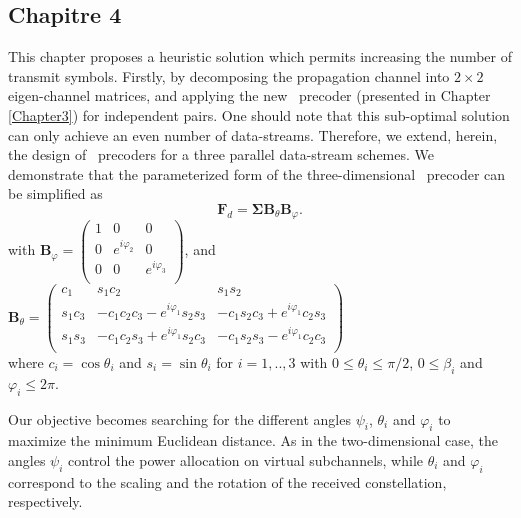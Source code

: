 \subsection*{Chapitre 4}
This chapter proposes a heuristic solution which permits increasing the number of transmit symbols. Firstly, by decomposing the propagation channel into $2 \times 2$ eigen-channel matrices, and applying the new \maxdmin\ precoder (presented in Chapter \ref{Chapter3}) for independent pairs. One should note that this sub-optimal solution can only achieve an even number of data-streams. Therefore, we extend, herein, the design of \maxdmin\ precoders for a three parallel data-stream schemes. We demonstrate that the parameterized form of the three-dimensional \maxdmin\ precoder can be  simplified as 
\begin{equation}
\label{eq_ab4_fdmin}
	\mathbf{F}_d= \mathbf{\Sigma} \mathbf{B}_\theta \mathbf{B}_\varphi .
\end{equation}
with $\mathbf{B}_\varphi = \begin{pmatrix}
				1 &  0 & 0 \\
				0 & e^{i \varphi_2} & 0 \\
				0 & 0 &  e^{i \varphi_3} \\
		 		\end{pmatrix}$,
and $\mathbf{B}_\theta = \begin{pmatrix}
				c_1 &  s_1 c_2 & s_1 s_2 \\
				s_1 c_3 & -c_1 c_2 c_3 - e^{i \varphi_1} s_2 s_3 & -c_1 s_2 c_3 + e^{i \varphi_1} c_2 s_3\\
				s_1 s_3 & -c_1 c_2 s_3 + e^{i \varphi_1} s_2 c_3 & -c_1 s_2 s_3 - e^{i \varphi_1} c_2 c_3\\
		 		\end{pmatrix}$ \\

where $c_i=\cos \theta_i$ and $s_i=\sin \theta_i$ for $i=1,..,3$ with $0 \leq \theta_i \leq \pi/2$, $0 \leq \beta_i$ and $\varphi_i \leq 2\pi$. 

Our objective becomes searching for the different angles $\psi_i$, $\theta_i$ and $\varphi_i$ to maximize the minimum Euclidean distance. As in the two-dimensional case, the angles $\psi_i$ control the power allocation on virtual subchannels, while $\theta_i$ and $\varphi_i$ correspond to the scaling and the rotation of the received constellation, respectively. 

